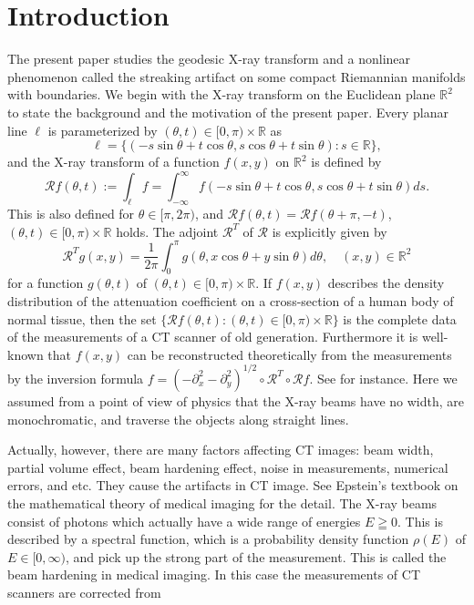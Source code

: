 \documentclass[a4paper,11pt,reqno]{amsart}
\numberwithin{equation}{section}
\theoremstyle{definition}
\theoremstyle{remark}
\begin{document}
\section{Introduction}
\label{section:introduction}
The present paper studies the geodesic X-ray transform and a nonlinear phenomenon called the streaking artifact on some compact Riemannian manifolds with boundaries. We begin with the X-ray transform on the Euclidean plane $\mathbb{R}^2$ to state the background and the motivation of the present paper. Every planar line $\ell$ is parameterized by $(\theta,t)\in[0,\pi)\times\mathbb{R}$ as %
%
$$
\ell
=
\{(-s\sin\theta+t\cos\theta,s\cos\theta+t\sin\theta) : s\in\mathbb{R}\}, 
$$   
%
%
and the X-ray transform of a function $f(x,y)$ on $\mathbb{R}^2$ is defined by 
%
%
$$
\mathcal{R}f(\theta,t)
:=
\int_\ell f
=
\int_{-\infty}^\infty
f(-s\sin\theta+t\cos\theta,s\cos\theta+t\sin\theta)
ds.
$$
%
%
This is also defined for $\theta\in[\pi,2\pi)$, and 
$\mathcal{R}f(\theta,t)=\mathcal{R}f(\theta+\pi,-t)$,  
$(\theta,t)\in[0,\pi)\times\mathbb{R}$ holds. 
The adjoint $\mathcal{R}^T$ of $\mathcal{R}$ is explicitly given by 
%
%
$$
\mathcal{R}^Tg(x,y)
=
\frac{1}{2\pi}
\int_0^\pi
g(\theta,x\cos\theta+y\sin\theta)
d\theta,
\quad
(x,y)\in\mathbb{R}^2
$$
%
%
for a function $g(\theta,t)$ of $(\theta,t)\in[0,\pi)\times\mathbb{R}$. If $f(x,y)$ describes the density distribution of the attenuation coefficient on a cross-section of a human body of normal tissue, then the set $\{\mathcal{R}f(\theta,t) : (\theta,t)\in[0,\pi)\times\mathbb{R}\}$ is the complete data of the measurements of a CT scanner of old generation. Furthermore it is well-known that $f(x,y)$ can be reconstructed theoretically from the measurements by the inversion formula 
$f=(-\partial_x^2-\partial_y^2)^{1/2}\circ\mathcal{R}^T\circ\mathcal{R}f$. 
See \cite{Helgason} for instance. 
Here we assumed from a point of view of physics that the X-ray beams have no width, are monochromatic, and traverse the objects along straight lines.  
%
%
\par
%
%
Actually, however, there are many factors affecting CT images: 
beam width, 
partial volume effect, 
beam hardening effect, 
noise in measurements, 
numerical errors, 
and etc. 
They cause the artifacts in CT image. 
See Epstein's textbook \cite{Epstein} on the mathematical theory of medical imaging for the detail. 
The X-ray beams consist of photons which actually have a wide range of energies $E\geqq0$. This is described by a spectral function, which is a probability density function $\rho(E)$ of $E\in[0,\infty)$, and pick up the strong part of the measurement. This is called the beam hardening in medical imaging. In this case the measurements of CT scanners are corrected from 
\end{document}
